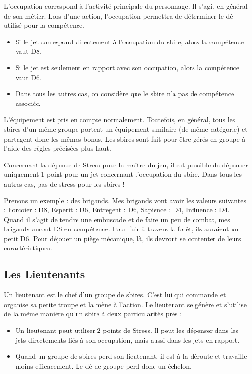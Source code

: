 L'occupation correspond à l'activité principale du personnage. Il s'agit en général de son métier. Lors d'une action, l'occupation permettra de déterminer le dé utilisé pour la compétence. 

\begin{itemize}
\item Si le jet correspond directement à l'occupation du sbire, alors la compétence vaut D8.
\item Si le jet est seulement en rapport avec son occupation, alors la compétence vaut D6.
\item Dans tous les autres cas, on considère que le sbire n'a pas de compétence associée.
\end{itemize}

L'équipement est pris en compte normalement. Toutefois, en général, tous les sbires d'un même groupe portent un équipement similaire (de même catégorie) et partagent donc les mêmes bonus. Les sbires sont fait pour être gérés en groupe à l'aide des règles précisées plus haut.

Concernant la dépense de Stress pour le maître du jeu, il est possible de dépenser uniquement 1 point pour un jet concernant l'occupation du sbire. Dans tous les autres cas, pas de stress pour les sbires ! 

Prenons un exemple : des brigands. Mes brigands vont avoir les valeurs suivantes : Forcoier : D8, Esperit : D6, Entregent : D6, Sapience : D4, Influence : D4. Quand il s'agit de tendre une embuscade et de faire un peu de combat, mes brigands auront D8 en compétence. Pour fuir à travers la forêt, ils auraient un petit D6. Pour déjouer un piège mécanique, là, ils devront se contenter de leurs caractéristiques.

\subsection{Les Lieutenants}

Un lieutenant est le chef d'un groupe de sbires. C'est lui qui commande et organise sa petite troupe et la mène à l'action. Le lieutenant se génère et s'utilise de la même manière qu'un sbire à deux particularités près :

\begin{itemize}
\item Un lieutenant peut utiliser 2 points de Stress. Il peut les dépenser dans les jets directements liés à son occupation, mais aussi dans les jets en rapport.
\item Quand un groupe de sbires perd son lieutenant, il est à la déroute et travaille moins efficacement. Le dé de groupe perd donc un échelon.
\end{itemize}

